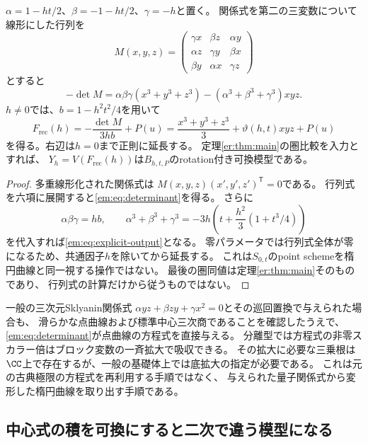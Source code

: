 \begin{proposition}[分離型の具体的復元手順]
\label{em:prop:determinant}
$\alpha=1-ht/2$、$\beta=-1-ht/2$、$\gamma=-h$と置く。
関係式を第二の三変数について線形にした行列を
\[
 M(x,y,z)=
 \begin{pmatrix}
 \gamma x&\beta z&\alpha y\\
 \alpha z&\gamma y&\beta x\\
 \beta y&\alpha x&\gamma z
 \end{pmatrix}
\]
とすると
\begin{equation}\label{em:eq:determinant}
 -\det M=\alpha\beta\gamma(x^3+y^3+z^3)
 -(\alpha^3+\beta^3+\gamma^3)xyz.
\end{equation}
$h\ne0$では、$b=1-h^2t^2/4$を用いて
\begin{equation}\label{em:eq:explicit-output}
 F_{\mathrm{rec}}(h)
 =-\frac{\det M}{3hb}+P(u)
 =\frac{x^3+y^3+z^3}{3}+\vartheta(h,t)xyz+P(u)
\end{equation}
を得る。右辺は$h=0$まで正則に延長する。
定理\ref{er:thm:main}の圏比較を入力とすれば、
$Y_h=V(F_{\mathrm{rec}}(h))$は$B_{h,t,P}$のrotation付き可換模型である。
\end{proposition}
\begin{proof}
多重線形化された関係式は
$M(x,y,z)(x',y',z')^{\mathsf T}=0$である。
行列式を六項に展開すると\eqref{em:eq:determinant}を得る。
さらに
\[
 \alpha\beta\gamma=hb,\qquad
 \alpha^3+\beta^3+\gamma^3
 =-3h\left(t+\frac{h^2}{3}(1+t^3/4)\right)
\]
を代入すれば\eqref{em:eq:explicit-output}となる。
零パラメータでは行列式全体が零になるため、共通因子$h$を除いてから延長する。
これは$S_{0,t}$のpoint schemeを楕円曲線と同一視する操作ではない。
最後の圏同値は定理\ref{er:thm:main}そのものであり、
行列式の計算だけから従うものではない。
\end{proof}

一般の三次元Sklyanin関係式
$\alpha yz+\beta zy+\gamma x^2=0$とその巡回置換で与えられた場合も、
滑らかな点曲線および標準中心三次商であることを確認したうえで、
\eqref{em:eq:determinant}が点曲線の方程式を直接与える。
分離型では方程式の非零スカラー倍はブロック変数の一斉拡大で吸収できる。
その拡大に必要な三乗根は$\CC$上で存在するが、一般の基礎体上では底拡大の指定が必要である。
これは元の古典極限の方程式を再利用する手順ではなく、
与えられた量子関係式から変形した楕円曲線を取り出す手順である。

\subsection{中心式の積を可換にすると二次で違う模型になる}

